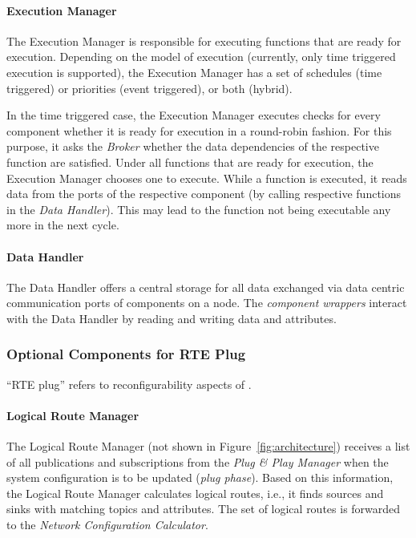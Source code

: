 \paragraph{Execution Manager}
The Execution Manager is responsible for executing functions that are ready for execution.
Depending on the model of execution (currently, only time triggered execution is supported),
the Execution Manager has a set of schedules (time triggered) or priorities (event triggered), or both (hybrid).

In the time triggered case, the Execution Manager executes checks for every component
whether it is ready for execution in a round-robin fashion.
For this purpose, it asks the \emph{Broker} whether the data dependencies of the respective function are satisfied.
Under all functions that are ready for execution, the Execution Manager chooses one to execute.
While a function is executed, it reads data from the ports of the respective component (by calling respective functions in the \emph{Data Handler}).
This may lead to the function not being executable any more in the next cycle.

\paragraph{Data Handler}

The Data Handler offers a central storage for all data exchanged via data centric communication ports of components on a node.
The \emph{component wrappers} interact with the Data Handler by reading and writing data and attributes.



\subsubsection{Optional Components for RTE Plug}

``RTE plug'' refers to reconfigurability aspects of \xme.

\paragraph{Logical Route Manager}
The Logical Route Manager (not shown in Figure~\ref{fig:architecture})
receives a list of all publications and subscriptions from the \emph{Plug \& Play Manager}
when the system configuration is to be updated (\emph{plug phase}).
Based on this information, the Logical Route Manager calculates logical routes,
i.e., it finds sources and sinks with matching topics and attributes.
The set of logical routes is forwarded to the \emph{Network Configuration Calculator}.

